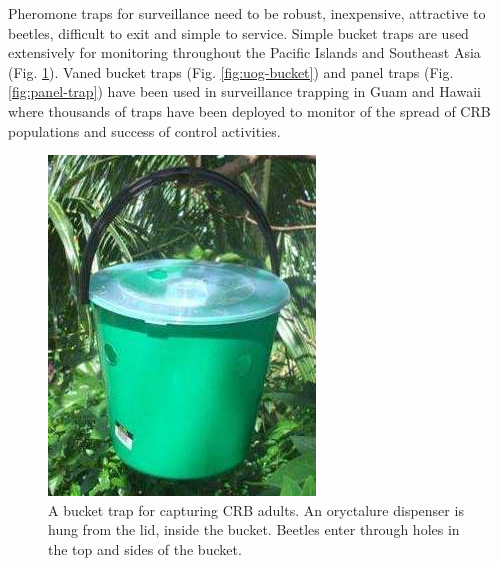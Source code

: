 \documentclass[twocolumn,letterpaper]{scrartcl}
\begin{document}
Pheromone traps for surveillance need to be robust, inexpensive, attractive to beetles, difficult to exit and simple to service. Simple bucket traps are used extensively for monitoring throughout the Pacific Islands and Southeast Asia (Fig. \ref{fig:spc-bucket}). Vaned bucket traps (Fig. \ref{fig:uog-bucket}) and panel traps (Fig. \ref{fig:panel-trap}) have been used in surveillance trapping in Guam and Hawaii where thousands of traps have been deployed to monitor of the spread of CRB populations and success of control activities.
\begin{figure}[h]
	\centering
	\includegraphics[width=0.7\linewidth]{images/spc-bucket}
	\caption{A bucket trap for capturing CRB adults. An oryctalure dispenser is hung from the lid, inside the bucket. Beetles enter through holes in the top and sides of the bucket.}
	\label{fig:spc-bucket}
\end{figure}
\end{document}
